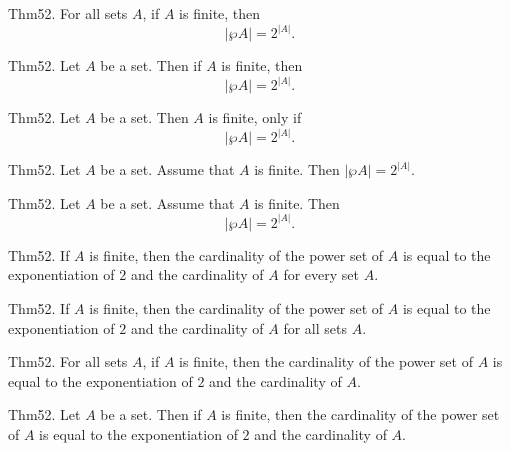\documentclass{article}
\begin{document}
Thm52. For all sets $A$, if $A$ is finite, then $$| \wp A | = 2 ^ {| A |}.$$

Thm52. Let $A$ be a set. Then if $A$ is finite, then $$| \wp A | = 2 ^ {| A |}.$$

Thm52. Let $A$ be a set. Then $A$ is finite, only if $$| \wp A | = 2 ^ {| A |}.$$

Thm52. Let $A$ be a set. Assume that $A$ is finite. Then $| \wp A | = 2 ^ {| A |}$.

Thm52. Let $A$ be a set. Assume that $A$ is finite. Then $$| \wp A | = 2 ^ {| A |}.$$

Thm52. If $A$ is finite, then the cardinality of the power set of $A$ is equal to the exponentiation of $2$ and the cardinality of $A$ for every set $A$.

Thm52. If $A$ is finite, then the cardinality of the power set of $A$ is equal to the exponentiation of $2$ and the cardinality of $A$ for all sets $A$.

Thm52. For all sets $A$, if $A$ is finite, then the cardinality of the power set of $A$ is equal to the exponentiation of $2$ and the cardinality of $A$.

Thm52. Let $A$ be a set. Then if $A$ is finite, then the cardinality of the power set of $A$ is equal to the exponentiation of $2$ and the cardinality of $A$.
\end{document}
